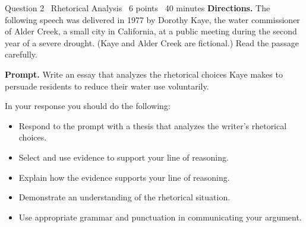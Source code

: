 \documentclass[11pt]{article}
\begin{document}
\begin{frq}{Question 2 \textperiodcentered\ Rhetorical Analysis \textperiodcentered\ 6 points \textperiodcentered\ 40 minutes}
\small
\textbf{Directions.} The following speech was delivered in 1977 by Dorothy Kaye, the water commissioner of Alder Creek, a small city in California, at a public meeting during the second year of a severe drought. (Kaye and Alder Creek are fictional.) Read the passage carefully.

\textbf{Prompt.} Write an essay that analyzes the rhetorical choices Kaye makes to persuade residents to reduce their water use voluntarily.

In your response you should do the following:
\begin{itemize}[leftmargin=1.5em,itemsep=1pt]
\item Respond to the prompt with a thesis that analyzes the writer's rhetorical choices.
\item Select and use evidence to support your line of reasoning.
\item Explain how the evidence supports your line of reasoning.
\item Demonstrate an understanding of the rhetorical situation.
\item Use appropriate grammar and punctuation in communicating your argument.
\end{itemize}
\end{frq}
\end{document}
